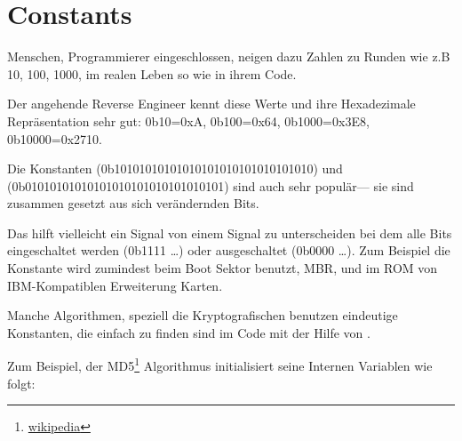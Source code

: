 \section{Constants}

Menschen, Programmierer eingeschlossen, neigen dazu Zahlen zu Runden wie z.B 10, 100, 1000,
im realen Leben so wie in ihrem Code.


Der angehende Reverse Engineer kennt diese Werte und ihre Hexadezimale Repräsentation sehr gut:
0b10=0xA, 0b100=0x64, 0b1000=0x3E8, 0b10000=0x2710.

Die Konstanten  (0b10101010101010101010101010101010) und 
 (0b01010101010101010101010101010101) sind auch sehr populär---
sie sind zusammen gesetzt aus sich verändernden Bits. %


Das hilft vielleicht ein Signal von einem Signal zu unterscheiden bei dem alle Bits eingeschaltet werden  (0b1111 \dots) oder ausgeschaltet (0b0000 \dots).
Zum Beispiel die  Konstante wird
zumindest beim Boot Sektor benutzt, \ac{MBR},
und im \ac{ROM} von IBM-Kompatiblen Erweiterung Karten.


Manche Algorithmen, speziell die Kryptografischen benutzen eindeutige Konstanten, die einfach zu finden 
sind im Code mit der Hilfe von \IDA.

\newcommand{\URLMD}{http://go.yurichev.com/17111}

Zum Beispiel, der MD5\footnote{\href{\URLMD}{wikipedia}} Algorithmus initialisiert seine Internen Variablen wie folgt:

